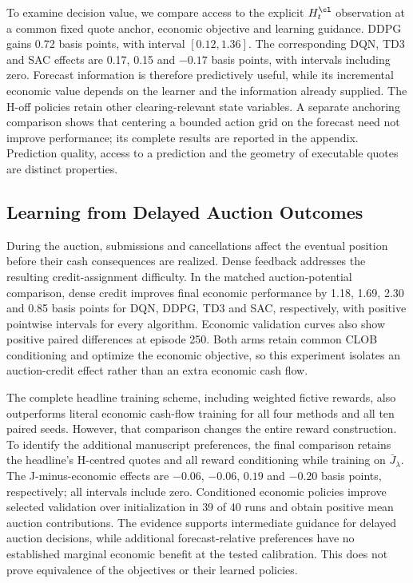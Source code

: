 To examine decision value, we compare access to the explicit $H_t^\cl$
observation at a common fixed quote anchor, economic objective and learning
guidance. DDPG gains 0.72 basis points, with interval $[0.12,1.36]$.
The corresponding DQN, TD3 and SAC effects are 0.17, 0.15 and $-0.17$
basis points, with intervals including zero. Forecast information is therefore
predictively useful, while its incremental economic value depends on the
learner and the information already supplied. The H-off policies retain other
clearing-relevant state variables. A separate anchoring comparison shows that
centering a bounded action grid on the forecast need not improve performance;
its complete results are reported in the appendix. Prediction quality, access
to a prediction and the geometry of executable quotes are distinct properties.

\subsection{Learning from Delayed Auction Outcomes}
\label{subsec:auction_learning}
During the auction, submissions and cancellations affect the eventual position
before their cash consequences are realized. Dense feedback addresses the
resulting credit-assignment difficulty. In the matched auction-potential
comparison, dense credit improves final economic performance by 1.18, 1.69,
2.30 and 0.85 basis points for DQN, DDPG, TD3 and SAC, respectively, with
positive pointwise intervals for every algorithm. Economic validation curves
also show positive paired differences at episode 250. Both arms retain common
CLOB conditioning and optimize the economic objective, so this experiment
isolates an auction-credit effect rather than an extra economic cash flow.

The complete headline training scheme, including weighted fictive rewards,
also outperforms literal economic cash-flow training for all four methods
and all ten paired seeds. However, that comparison changes the entire reward
construction. To identify the additional manuscript preferences, the final
comparison retains the headline's H-centred quotes and all reward conditioning
while training on $\bar J_\lambda$. The J-minus-economic effects are
$-0.06$, $-0.06$, $0.19$ and $-0.20$ basis points, respectively; all intervals
include zero. Conditioned economic policies improve selected validation over
initialization in 39 of 40 runs and obtain positive mean auction contributions.
The evidence supports intermediate guidance for delayed auction decisions,
while additional forecast-relative preferences have no established marginal
economic benefit at the tested calibration. This does not prove equivalence
of the objectives or their learned policies.

